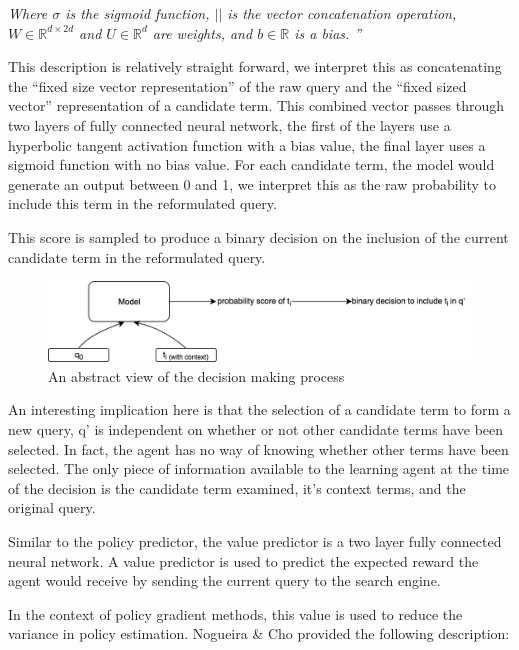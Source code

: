 \textit{Where $\sigma$ is the sigmoid function, $||$ is the vector concatenation operation, $W \in \mathbb{R}^{d\times2d}$  and $U \in \mathbb{R}^d$ are weights, and $b \in \mathbb{R}$ is a bias. ''}

This description is relatively straight forward, we interpret this as concatenating the “fixed size vector representation” of the raw query and the “fixed sized vector” representation of a candidate term. This combined vector passes through two layers of fully connected neural network, the first of the layers use a hyperbolic tangent activation function with a bias value, the final layer uses a sigmoid function with no bias value. For each candidate term, the model would generate an output between 0 and 1, we interpret this as the raw probability to include this term in the reformulated query. 

This score is sampled to produce a binary decision on the inclusion of the current candidate term in the reformulated query.

\begin{figure}
  \centering
    \includegraphics[width=1\textwidth]{images/chapter_4/Chapter_4-term_selection_process.png}
  \caption{An abstract view of the decision making process}
    \label{fig:CNN1}
\end{figure}

An interesting implication here is that the selection of a candidate term to form a new query, q’ is independent on whether or not other candidate terms have been selected. In fact, the agent has no way of knowing whether other terms have been selected. The only piece of information available to the learning agent at the time of the decision is the candidate term examined, it's context terms, and the original query. 

Similar to the policy predictor, the value predictor is a two layer fully connected neural network. A value predictor is used to predict the expected reward the agent would receive by sending the current query to the search engine. 

In the context of policy gradient methods, this value is used to reduce the variance in policy estimation. Nogueira \& Cho \cite{nogueira2017task} provided the following description:


